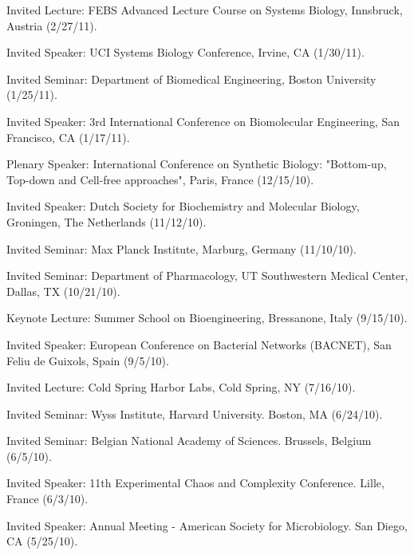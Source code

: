 \item Invited Lecture: FEBS Advanced Lecture Course on Systems Biology, Innsbruck, Austria (2/27/11). 

\item Invited Speaker: UCI Systems Biology Conference, Irvine, CA (1/30/11). 

\item Invited Seminar: Department of Biomedical Engineering, Boston University (1/25/11). 

\item Invited Speaker: 3rd International Conference on Biomolecular Engineering, San Francisco, CA (1/17/11). 


\item Plenary Speaker: International Conference on Synthetic Biology: "Bottom-up, Top-down and Cell-free approaches", Paris, France (12/15/10). 

\item Invited Speaker: Dutch Society for Biochemistry and Molecular Biology, Groningen, The Netherlands (11/12/10). 

\item Invited Seminar: Max Planck Institute, Marburg, Germany (11/10/10).

\item Invited Seminar: Department of Pharmacology, UT Southwestern Medical Center, Dallas, TX (10/21/10). 

\item Keynote Lecture: Summer School on Bioengineering, Bressanone, Italy (9/15/10). 

\item Invited Speaker: European Conference on Bacterial Networks (BACNET), San Feliu de Guixols, Spain (9/5/10).

\item Invited Lecture: Cold Spring Harbor Labs, Cold Spring, NY (7/16/10).

\item Invited Seminar: Wyss Institute, Harvard University.  Boston, MA (6/24/10).

\item Invited Seminar: Belgian National Academy of Sciences.  Brussels, Belgium (6/5/10).

\item Invited Speaker: 11th Experimental Chaos and Complexity Conference.  Lille, France (6/3/10).

\item Invited Speaker: Annual Meeting - American Society for Microbiology.  San Diego, CA (5/25/10).

